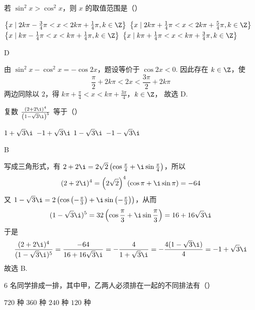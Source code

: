 \documentclass[UTF8,a4paper,oneside,11pt]{ctexbook}
\begin{document}
\begin{problem}
若 \(\sin^2 x > \cos^2 x\)，则 \(x\) 的取值范围是（\quad）

\choices
    {\(\left\{x\mid 2k\pi -\frac{3}{4}\pi < x < 2k\pi +\frac{1}{4}\pi ,k\in \Z\right\}\)}
    {\(\left\{x\mid 2k\pi +\frac{1}{4}\pi < x < 2k\pi +\frac{5}{4}\pi ,k\in \Z\right\}\)}
    {\(\left\{x\mid k\pi -\frac{1}{4}\pi < x < k\pi + \frac{1}{4}\pi ,k\in \Z\right\}\)}
    {\(\left\{x\mid k\pi +\frac{1}{4}\pi < x < k\pi +\frac{3}{4}\pi ,k\in \Z\right\}\)}
\end{problem}

\begin{answer}
D
\end{answer}

\begin{solution}
由 \(\sin^2x-\cos^2x=-\cos2x\)，题设等价于 \(\cos2x<0\). 因此存在 \(k\in\Z\)，使
\[
\frac{\pi}{2}+2k\pi<2x<\frac{3\pi}{2}+2k\pi
\]
两边同除以 \(2\)，得
\(k\pi+\frac{\pi}{4}<x<k\pi+\frac{3\pi}{4}\)，\(k\in\Z\)，
故选 D.
\end{solution}

\begin{problem}
复数 \(\frac{\left(2 + 2\i\right)^4}{\left(1 - \sqrt{3}\i\right)^5}\) 等于（\quad）

\choices
    {\(1 + \sqrt{3}\i\)}
    {\(-1 + \sqrt{3}\i\)}
    {\(1 - \sqrt{3}\i\)}
    {\(-1 - \sqrt{3}\i\)}
\end{problem}

\begin{answer}
B
\end{answer}

\begin{solution}
写成三角形式，有 \(2+2\i=2\sqrt{2}\left(\cos\frac{\pi}{4}+\i\sin\frac{\pi}{4}\right)\)，所以
\[
(2+2\i)^4=\left(2\sqrt{2}\right)^4\left(\cos\pi+\i\sin\pi\right)=-64
\]
又 \(1-\sqrt{3}\i=2\left(\cos\left(-\frac{\pi}{3}\right)+\i\sin\left(-\frac{\pi}{3}\right)\right)\)，从而
\[
(1-\sqrt{3}\i)^5=32\left(\cos\frac{\pi}{3}+\i\sin\frac{\pi}{3}\right)=16+16\sqrt{3}\i
\]
于是
\[
\frac{(2+2\i)^4}{(1-\sqrt{3}\i)^5}=\frac{-64}{16+16\sqrt{3}\i}=-\frac{4}{1+\sqrt{3}\i}=-\frac{4(1-\sqrt{3}\i)}{4}=-1+\sqrt{3}\i
\]
故选 B.
\end{solution}

\begin{problem}
\(6\text{ 名}\)同学排成一排，其中甲，乙两人必须排在一起的不同排法有（\quad）

\choices
    {\(720\text{ 种}\)}
    {\(360\text{ 种}\)}
    {\(240\text{ 种}\)}
    {\(120\text{ 种}\)}
\end{problem}
\end{document}
